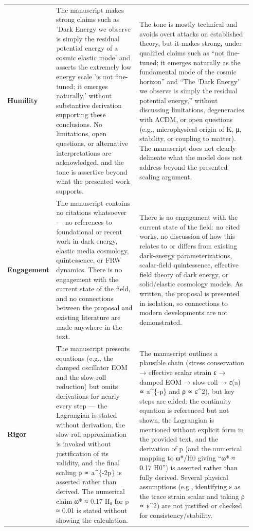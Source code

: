 \documentclass[11pt]{article}
\begin{document}
\begin{longtable}{@{} p{2.2cm} p{6.3cm} p{6.3cm} @{}}
\rowcolor{rowgray}
\textbf{Humility} &
The manuscript makes strong claims such as 'Dark Energy we observe is simply the residual potential energy of a cosmic elastic mode' and asserts the extremely low energy scale 'is not fine-tuned; it emerges naturally,' without substantive derivation supporting these conclusions. No limitations, open questions, or alternative interpretations are acknowledged, and the tone is assertive beyond what the presented work supports. &
The tone is mostly technical and avoids overt attacks on established theory, but it makes strong, under-qualified claims such as “not fine-tuned; it emerges naturally as the fundamental mode of the cosmic horizon” and “The ‘Dark Energy’ we observe is simply the residual potential energy,” without discussing limitations, degeneracies with ΛCDM, or open questions (e.g., microphysical origin of K, μ, stability, or coupling to matter). The manuscript does not clearly delineate what the model does not address beyond the presented scaling argument. \\[6pt]

\textbf{Engagement} &
The manuscript contains no citations whatsoever — no references to foundational or recent work in dark energy, elastic media cosmology, quintessence, or FRW dynamics. There is no engagement with the current state of the field, and no connections between the proposal and existing literature are made anywhere in the text. &
There is no engagement with the current state of the field: no cited works, no discussion of how this relates to or differs from existing dark-energy parameterizations, scalar-field quintessence, effective field theory of dark energy, or solid/elastic cosmology models. As written, the proposal is presented in isolation, so connections to modern developments are not demonstrated. \\[6pt]

\rowcolor{rowgray}
\textbf{Rigor} &
The manuscript presents equations (e.g., the damped oscillator EOM and the slow-roll reduction) but omits derivations for nearly every step — the Lagrangian is stated without derivation, the slow-roll approximation is invoked without justification of its validity, and the final scaling ρ ∝ a\textasciicircum{}\{-2p\} is asserted rather than derived. The numerical claim ω* ≈ 0.17 H₀ for p ≈ 0.01 is stated without showing the calculation. &
The manuscript outlines a plausible chain (stress conservation → effective scalar strain ε → damped EOM → slow-roll → ε(a) ∝ a\textasciicircum{}\{-p\} and ρ ∝ ε\textasciicircum{}2), but key steps are elided: the continuity equation is referenced but not shown, the Lagrangian is mentioned without explicit form in the provided text, and the derivation of p (and the numerical mapping to ω*/H0 giving “ω* ≈ 0.17 H0”) is asserted rather than fully derived. Several physical assumptions (e.g., identifying ε as the trace strain scalar and taking ρ ∝ ε\textasciicircum{}2) are not justified or checked for consistency/stability. \\[6pt]


\end{longtable}
\end{document}
